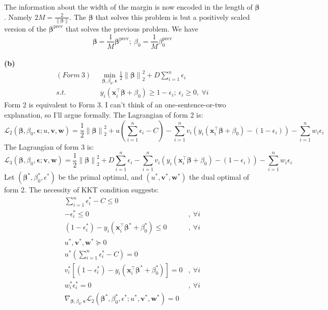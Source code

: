 \documentclass[11pt]{article}
\begin{document}
The information about the width of the margin is now encoded in the length of $\bm{\beta}$. Namely $2M = \frac{2}{\left\lVert \bm{\beta} \right\rVert}$. The $\bm{\beta}$ that solves this problem is but a positively scaled version of the $\bm{\beta}^{\text{prev}}$ that solves the previous problem. We have
$$
\bm{\beta} = \frac{1}{M} \bm{\beta}^{\text{prev}};~\beta_0 = \frac{1}{M} \beta_0^{\text{prev}}
$$
~\\
\textbf{(b)}
\begin{equation}
  \begin{split}
    (Form~3)~~ &\min\limits_{\bm{\beta}, \beta_0, \bm{\epsilon}} \frac{1}{2}\left\lVert \bm{\beta} \right\rVert_2^2 + D\sum_{i=1}^n \epsilon_i\\
    s.t. \quad & y_i(\bm{x}_i^{\top} \bm{\beta} + \beta_0) \geq 1- \epsilon_i; ~\epsilon_i \geq 0, ~\forall i 
  \end{split}
\end{equation}
Form 2 is equivalent to Form 3. I can't think of an one-sentence-or-two explanation, so I'll argue formally. The Lagrangian of form 2 is:
\begin{equation}
  \mathcal{L}_2(\bm{\beta}, \beta_0, \bm{\epsilon}; u, \bm{v}, \bm{w}) = \frac{1}{2}\left\lVert \bm{\beta} \right\rVert_2^2 + u \left(\sum_{i=1}^n \epsilon_i - C\right) - \sum_{i=1}^n v_i \left( y_i(\bm{x}_i^{\top} \bm{\beta} + \beta_0) - (1- \epsilon_i) \right) - \sum_{i=1}^n w_i \epsilon_i
\end{equation}
The Lagrangian of form 3 is:
\begin{equation}
  \mathcal{L}_3(\bm{\beta}, \beta_0, \bm{\epsilon}; \bm{v}, \bm{w}) = \frac{1}{2}\left\lVert \bm{\beta} \right\rVert_2^2 + D \sum_{i=1}^n \epsilon_i  - \sum_{i=1}^n v_i \left( y_i(\bm{x}_i^{\top} \bm{\beta} + \beta_0) - (1- \epsilon_i) \right) - \sum_{i=1}^n w_i \epsilon_i
\end{equation}
Let $(\bm{\beta}^*, \beta^*_0, \epsilon^*)$ be the primal optimal, and $(u^*, \bm{v}^*, \bm{w}^*)$ the dual optimal of form 2. The necessity of KKT condition suggests:
\begin{equation}\label{f2kkt}
  \begin{split}
  \textstyle \sum_{i=1}^n \epsilon_i^* - C\leq 0 & \\
  -\epsilon_i^* \leq 0 &,~\forall i \\
  (1- \epsilon_i^*) - y_i(\bm{x}_i^{\top} \bm{\beta}^* + \beta_0^*) \leq 0 &,~\forall i\\
  u^*, \bm{v}^*, \bm{w}^* \succeq 0\\
  u^*(\textstyle \sum_{i=1}^n \epsilon_i^* - C) = 0 &\\
  v_i^*[(1- \epsilon_i^*) - y_i(\bm{x}_i^{\top} \bm{\beta}^* + \beta_0^*)] = 0 &,~\forall i\\
  w_i^* \epsilon_i^* = 0 &,~\forall i\\
    \nabla_{ \bm{\beta}, \beta_0, \bm{\epsilon} } \mathcal{L}_2(\bm{\beta}^*, \beta^*_0, \epsilon^*; u^*, \bm{v}^*, \bm{w}^*) = 0 &
  \end{split}
\end{equation}
\end{document}
